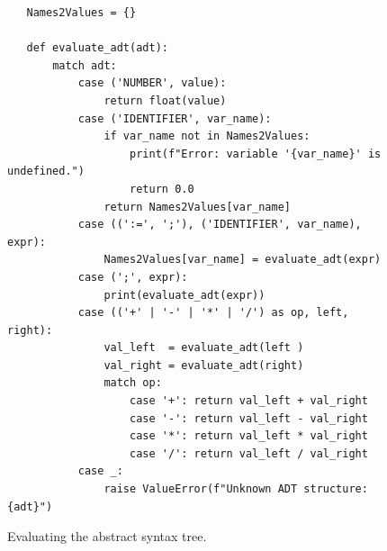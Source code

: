 \begin{figure}[!ht]
\centering
\begin{verbatim}
   Names2Values = {}

   def evaluate_adt(adt):
       match adt:
           case ('NUMBER', value):
               return float(value)
           case ('IDENTIFIER', var_name):
               if var_name not in Names2Values:
                   print(f"Error: variable '{var_name}' is undefined.")
                   return 0.0
               return Names2Values[var_name]
           case ((':=', ';'), ('IDENTIFIER', var_name), expr):
               Names2Values[var_name] = evaluate_adt(expr)
           case (';', expr):
               print(evaluate_adt(expr))
           case (('+' | '-' | '*' | '/') as op, left, right):
               val_left  = evaluate_adt(left )
               val_right = evaluate_adt(right)
               match op:
                   case '+': return val_left + val_right
                   case '-': return val_left - val_right
                   case '*': return val_left * val_right
                   case '/': return val_left / val_right
           case _:
               raise ValueError(f"Unknown ADT structure: {adt}")
\end{verbatim}
\vspace*{-0.3cm}
\caption{Evaluating the abstract syntax tree.}
\label{fig:01-Calculator.ipynb:eval}
\end{figure}

